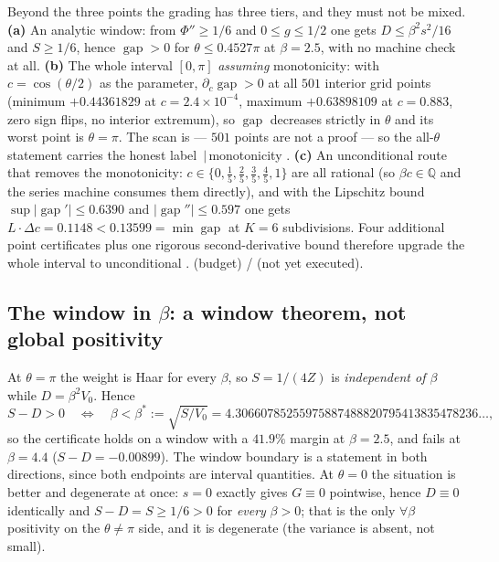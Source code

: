 Beyond the three points the grading has three tiers, and they must not be mixed.
\textbf{(a)} An analytic \LT{} window: from $\Phi''\ge1/6$ and $0\le g\le1/2$ one gets
$D\le\beta^{2}s^{2}/16$ and $S\ge1/6$, hence $\operatorname{gap}>0$ for
$\theta\le0.4527\pi$ at $\beta=2.5$, with no machine check at all. \LT{}
\textbf{(b)} The whole interval $[0,\pi]$ \emph{assuming} monotonicity: with $c=\cos(\theta/2)$ as
the parameter, $\partial_c\operatorname{gap}>0$ at all $501$ interior grid points (minimum
$+0.44361829$ at $c=2.4\times10^{-4}$, maximum $+0.63898109$ at $c=0.883$, zero sign flips, no
interior extremum), so $\operatorname{gap}$ decreases strictly in $\theta$ and its worst point is
$\theta=\pi$. The scan is \LC{} --- $501$ points are not a proof --- so the all-$\theta$ statement
carries the honest label \LT{}\,$|\,$monotonicity \LC{}.
\textbf{(c)} An unconditional route that removes the monotonicity: $c\in\{0,\tfrac15,\tfrac25,
\tfrac35,\tfrac45,1\}$ are all rational (so $\beta c\in\mathbb{Q}$ and the  series
machine consumes them directly), and with the Lipschitz bound $\sup|\operatorname{gap}'|\le0.6390$
and $|\operatorname{gap}''|\le0.597$ one gets $L\cdot\Delta c=0.1148<0.13599=\min
\operatorname{gap}$ at $K=6$ subdivisions. Four additional point certificates plus one rigorous
second-derivative bound therefore upgrade the whole interval to unconditional \LT. \LC{} (budget)
/ \LM{} (not yet executed).


\subsection{The window in $\beta$: a window theorem, not global positivity}

At $\theta=\pi$ the weight is Haar for every $\beta$, so $S=1/(4Z)$ is \emph{independent of
$\beta$} while $D=\beta^{2}V_0$. Hence
\begin{equation}
S-D>0\quad\Longleftrightarrow\quad \beta<\beta^{*}:=\sqrt{S/V_0}
=4.30660785255975887488820795413835478236\ldots,
\label{eq:betastar5}
\end{equation}
so the certificate holds on a window with a $41.9\%$ margin at $\beta=2.5$, and fails at
$\beta=4.4$ ($S-D=-0.00899$). The window boundary is a \LT{} statement in both directions, since
both endpoints are interval quantities. \LT{} At $\theta=0$ the situation is better and degenerate
at once: $s=0$ exactly gives $G\equiv0$ pointwise, hence $D\equiv0$ identically and
$S-D=S\ge1/6>0$ for \emph{every} $\beta>0$; that is the only $\forall\beta$ positivity on the
$\theta\ne\pi$ side, and it is degenerate (the variance is absent, not small). \LT{}

